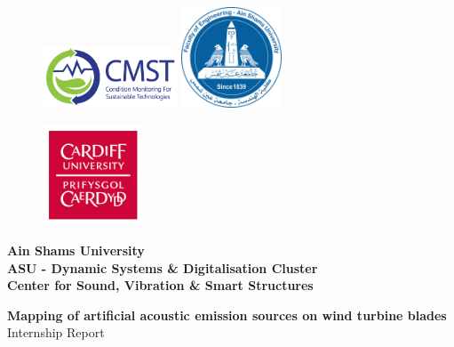 \documentclass[a4paper, 12pt, twoside,openany]{book}
\begin{document}
\begin{titlepage}
    \begin{figure}[ht]
            \includegraphics[width=4cm]{logo3}
       \endminipage
            \centering\includegraphics[width=3cm]{logo}
       \endminipage
            \raggedright\includegraphics[width = 3cm]{logo2}
        \endminipage
    \end{figure}
    \vspace{13mm}

    \begin{Large}
     \begin{center}
        \textbf{\LARGE{Ain Shams University}\\\vspace{5mm} \Large{ASU - Dynamic Systems \& Digitalisation Cluster} \\ \vspace{5mm} \large{Center for Sound, Vibration \& Smart Structures \\}}
        \vspace{10mm}

        \vspace{8mm}
        \begin{spacing}{1.25}
            \vspace{5mm}
            \huge{\bf  Mapping of artificial acoustic emission sources on wind turbine blades}\\
            \vspace{5mm}
            \LARGE{Internship Report}
        \end{spacing}


\end{center}
\end{Large}
\end{titlepage}
\end{document}
